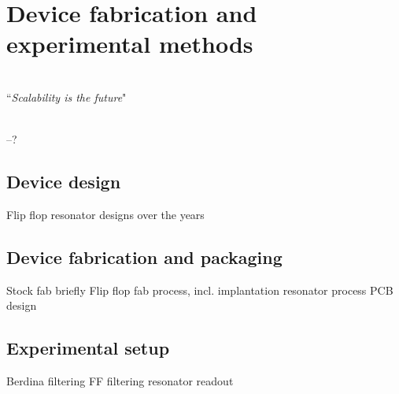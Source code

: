 
\chapter{Device fabrication and experimental methods} %

\label{Chapter5} 

\HRule
\vspace{0.5cm} \hspace{2cm}
\small
\hangindent=4cm
\\
        ``\emph{Scalability is the future}"
\\ \\
\hangindent=4cm
\begin{flushright}
--? \\
\end{flushright}

\vspace{0.5cm}

\noindent \HRule
\clearpage

\section{Device design}
Flip flop
resonator designs over the years

\section{Device fabrication and packaging} \label{sec:fabrication}
Stock fab briefly
Flip flop fab process, incl. implantation
resonator process
PCB design

\section{Experimental setup}
Berdina filtering
FF filtering
resonator readout



